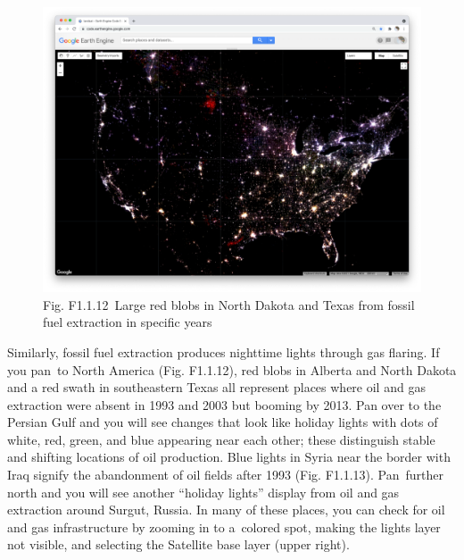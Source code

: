 \documentclass[
  letterpaper,
  DIV=11,
  numbers=noendperiod]{scrreprt}
\begin{document}
\begin{figure}

{\centering \includegraphics{./F1/image52.png}

}

\caption{Fig. F1.1.12~Large red blobs in North Dakota and Texas from
fossil fuel extraction in specific years}

\end{figure}

Similarly, fossil fuel extraction produces nighttime lights through gas
flaring. If you pan~to North America (Fig. F1.1.12), red blobs in
Alberta and North Dakota and a red swath in southeastern Texas all
represent places where oil and gas extraction were absent in 1993 and
2003 but booming by 2013. Pan over to the Persian Gulf and you will see
changes that look like holiday lights with dots of white, red, green,
and blue appearing near each other; these distinguish stable and
shifting locations of oil production. Blue lights in Syria near the
border with Iraq signify the abandonment of oil fields after 1993 (Fig.
F1.1.13). Pan~further north and you will see another ``holiday lights''
display from oil and gas extraction around Surgut, Russia. In many of
these places, you can check for oil and gas infrastructure by zooming in
to a~colored spot, making the lights layer not visible, and selecting
the Satellite base layer (upper right).
\end{document}
